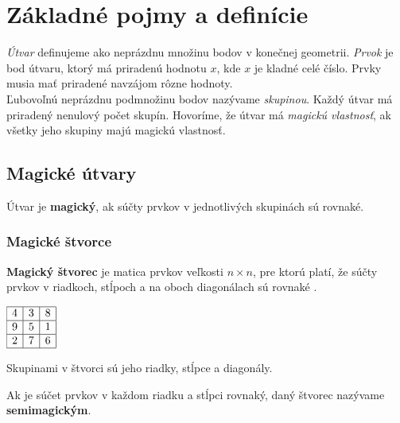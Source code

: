\chapter{Základné pojmy a definície}

\label{kap:definitions} %

\textit{Útvar} definujeme ako neprázdnu množinu bodov v konečnej geometrii. \textit{Prvok} je bod útvaru, ktorý má priradenú hodnotu $x$, kde $x$ je kladné celé číslo. Prvky musia mať priradené navzájom rôzne hodnoty. \\

Ľubovoľnú neprázdnu podmnožinu bodov nazývame \textit{skupinou}. Každý útvar má priradený nenulový počet skupín. Hovoríme, že útvar má \textit{magickú vlastnosť}, ak všetky jeho skupiny majú magickú vlastnosť.

\section{Magické útvary}
\begin{definition} Útvar je \textbf{magický}, ak súčty prvkov v jednotlivých skupinách sú rovnaké.
\end{definition}

\subsection{Magické štvorce}
\begin{definition} \textbf{Magický štvorec} je matica prvkov veľkosti $n \times n$, pre ktorú platí, že súčty prvkov v riadkoch, stĺpoch a na oboch diagonálach sú rovnaké \cite{multimagie}.
\end{definition}

\begin{center}
$\begin{array}{ |c|c|c| } 
\hline
4 & 3 & 8 \\ 
\hline
9 & 5 & 1 \\ 
\hline
2 & 7 & 6 \\
\hline
\end{array}$
\end{center}

Skupinami v štvorci sú jeho riadky, stĺpce a diagonály.

\begin{definition} Ak je súčet prvkov v každom riadku a stĺpci rovnaký, daný štvorec nazývame \textbf{semimagickým}.
\end{definition}

